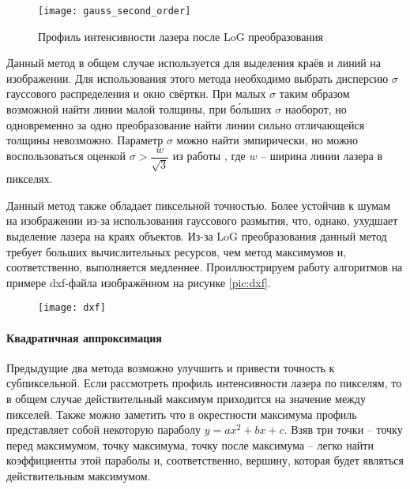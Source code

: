                 \begin{wrapfigure}{r}{0.4\linewidth}
                    \centering
                    \texttt{[image: gauss\_second\_order]}
                    \caption{Профиль интенсивности лазера после LoG преобразования}
                \end{wrapfigure}
                Данный метод в общем случае используется для выделения краёв и линий на изображении\cite{Steger2000}. Для использования этого метода необходимо выбрать дисперсию $ \sigma $ гауссового распределения и окно свёртки. При малых $ \sigma $ таким образом возможной найти линии малой толщины, при б\'{о}льших $ \sigma $ наоборот, но одновременно за одно преобразование найти линии сильно отличающейся толщины невозможно. Параметр $ \sigma $ можно найти эмпирически, но можно воспользоваться оценкой $ \sigma > \dfrac{w}{\sqrt{3}} $ из работы \cite{Steger2000}, где $ w $ -- ширина линии лазера в пикселях.
                
                Данный метод также обладает пиксельной точностью. Более устойчив к шумам на изображении из-за использования гауссового размытия, что, однако, ухудшает выделение лазера на краях объектов. Из-за LoG преобразования данный метод требует больших вычислительных ресурсов, чем метод максимумов и, соответственно, выполняется медленнее. Проиллюстрируем работу алгоритмов на примере dxf-файла изображённом на рисунке \ref{pic:dxf}.
                
                \begin{figure}[!ht]
                    \centering
                    \texttt{[image: dxf]}
                \end{figure}
            
            \paragraph{Квадратичная аппроксимация}
                Предыдущие два метода возможно улучшить и привести точность к субпиксельной\cite{Molder2014}. Если рассмотреть профиль интенсивности лазера по пикселям, то в общем случае действительный максимум приходится на значение между пикселей. Также можно заметить что в окрестности максимума профиль представляет собой некоторую параболу $ y = ax^2 + bx + c $. Взяв три точки -- точку перед максимумом, точку максимума, точку после максимума -- легко найти коэффициенты этой параболы и, соответственно, вершину, которая будет являться действительным максимумом.
                
